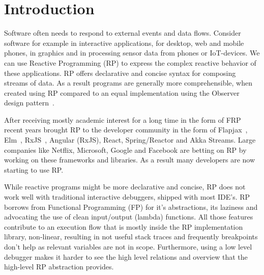 \section{Introduction}
Software often needs to respond to external events and data flows. Consider software for example in interactive applications, for desktop, web and mobile phones, in graphics and in processing sensor data from phones or IoT-devices. We can use Reactive Programming (RP) to express the complex reactive behavior of these applications. RP offers declarative and concise syntax for composing streams of data. As a result programs are generally more comprehensible, when created using RP compared to an equal implementation using the Observer design pattern~\cite{johnson1995design, salvaneschi2014empirical}.

After receiving mostly academic interest for a long time in the form of FRP~\cite{elliott1997functional,elliott2009push,czaplicki2013asynchronous,maier2010deprecating} recent years brought RP to the developer community in the form of Flapjax~\cite{meyerovich2009flapjax}, Elm~\cite{czaplicki2012elm}, RxJS~\cite{meijer2010subject}, Angular (RxJS), React, Spring/Reactor and Akka Streams. Large companies like Netflix, Microsoft, Google and Facebook are betting on RP by working on these frameworks and libraries. As a result many developers are now starting to use RP.



While reactive programs might be more declarative and concise, RP does not work well with traditional interactive debuggers, shipped with most IDE's. RP borrows from Functional Programming (FP) for it's abstractions, its laziness and advocating the use of clean input/output (lambda) functions. All those features contribute to an execution flow that is mostly inside the RP implementation library, non-linear, resulting in not useful stack traces and frequently breakpoints don't help as relevant variables are not in scope. Furthermore, using a low level debugger makes it harder to see the high level relations and overview that the high-level RP abstraction provides.


